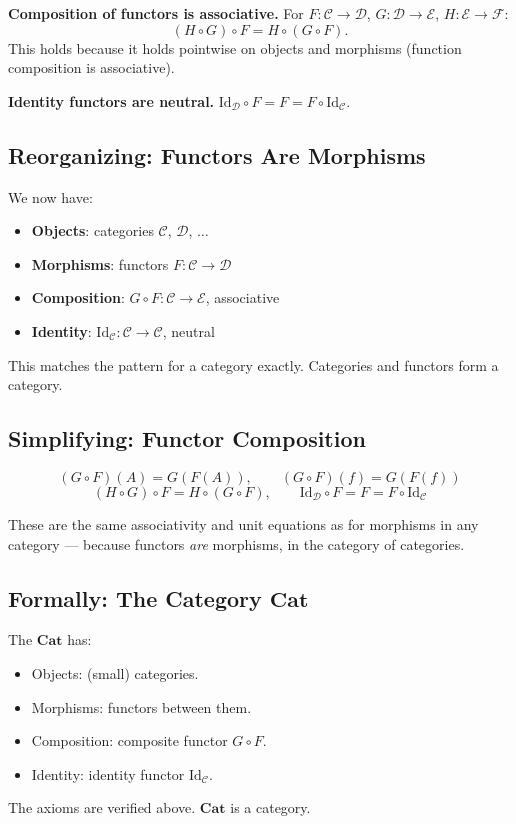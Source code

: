 \textbf{Composition of functors is associative.} For $F : \mathcal{C} \to
\mathcal{D}$, $G : \mathcal{D} \to \mathcal{E}$, $H : \mathcal{E} \to
\mathcal{F}$:
\[
  (H \circ G) \circ F = H \circ (G \circ F).
\]
This holds because it holds pointwise on objects and morphisms (function
composition is associative).

\textbf{Identity functors are neutral.} $\mathrm{Id}_\mathcal{D} \circ F =
F = F \circ \mathrm{Id}_\mathcal{C}$.

\subsection{Reorganizing: Functors Are Morphisms}

We now have:
\begin{itemize}
  \item \textbf{Objects}: categories $\mathcal{C}$, $\mathcal{D}$, $\ldots$
  \item \textbf{Morphisms}: functors $F : \mathcal{C} \to \mathcal{D}$
  \item \textbf{Composition}: $G \circ F : \mathcal{C} \to \mathcal{E}$,
        associative
  \item \textbf{Identity}: $\mathrm{Id}_\mathcal{C} : \mathcal{C} \to
        \mathcal{C}$, neutral
\end{itemize}

This matches the pattern for a category exactly. Categories and functors
form a category.

\subsection{Simplifying: Functor Composition}

\[
  (G \circ F)(A) = G(F(A)),\qquad (G \circ F)(f) = G(F(f))
\]
\[
  (H \circ G) \circ F = H \circ (G \circ F),\qquad
  \mathrm{Id}_\mathcal{D} \circ F = F = F \circ \mathrm{Id}_\mathcal{C}
\]

These are the same associativity and unit equations as for morphisms in any
category --- because functors \emph{are} morphisms, in the category of
categories.

\subsection{Formally: The Category $\mathbf{Cat}$}

The  $\mathbf{Cat}$ has:
\begin{itemize}
  \item Objects: (small) categories.
  \item Morphisms: functors between them.
  \item Composition: composite functor $G \circ F$.
  \item Identity: identity functor $\mathrm{Id}_\mathcal{C}$.
\end{itemize}
The axioms are verified above. $\mathbf{Cat}$ is a category.

